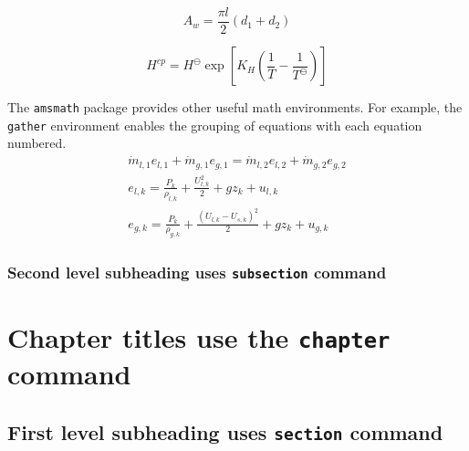 \documentclass[openany, 12pt]{book}
\begin{document}
\begin{equation}
    A_w = \frac{\pi l}{2}\left(d_1 + d_2\right)
\end{equation}


\begin{equation}
    H^{cp} = H^\ominus \exp\left[K_H\left(\frac{1}{T}-\frac{1}{T^\ominus}\right)\right]
\end{equation}


The \texttt{amsmath} package provides other useful math environments.
For example, the \texttt{gather} environment enables the grouping of equations with each equation numbered.
\begin{gather}
    \dot{m}_{l,1}e_{l,1} + \dot{m}_{g,1}e_{g,1} = \dot{m}_{l,2}e_{l,2} + \dot{m}_{g,2}e_{g,2} \label{eq:energy-conservation} \\
    e_{l,k} = \frac{P_k}{\rho_{l,k}} + \frac{U^2_{l,k}}{2} + gz_k + u_{l,k} \label{eq:liquid-energy} \\
    e_{g,k} = \frac{P_k}{\rho_{g,k}} + \frac{\left(U_{l,k}-U_{s,k}\right)^2}{2} + gz_k + u_{g,k} \label{eq:gas-energy}
\end{gather}

\subsection{Second level subheading uses \texttt{subsection} command}

\chapter{Chapter titles use the \texttt{chapter} command}

\section{First level subheading uses \texttt{section} command}
\end{document}
